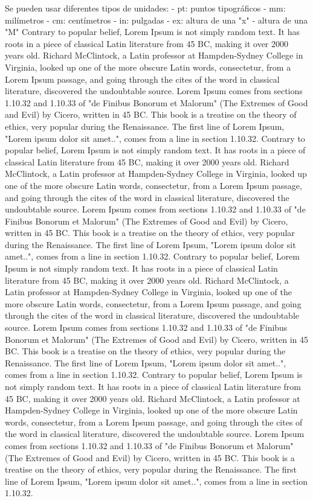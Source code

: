 \documentclass[12pt,letterpaper]{article} %
\begin{document}
	Se pueden usar diferentes tipos de unidades:
	- pt: puntos tipográficos
	- mm: milímetros
	- cm: centímetros
	- in: pulgadas
	- ex: altura de una "x"
	- altura de una "M"
	Contrary to popular belief, Lorem Ipsum is not simply random text. It has roots in a piece of classical Latin literature from 45 BC, making it over 2000 years old. Richard McClintock, a Latin professor at Hampden-Sydney College in Virginia, looked up one of the more obscure Latin words, consectetur, from a Lorem Ipsum passage, and going through the cites of the word in classical literature, discovered the undoubtable source. Lorem Ipsum comes from sections 1.10.32 and 1.10.33 of "de Finibus Bonorum et Malorum" (The Extremes of Good and Evil) by Cicero, written in 45 BC. This book is a treatise on the theory of ethics, very popular during the Renaissance. The first line of Lorem Ipsum, "Lorem ipsum dolor sit amet..", comes from a line in section 1.10.32.
	Contrary to popular belief, Lorem Ipsum is not simply random text. It has roots in a piece of classical Latin literature from 45 BC, making it over 2000 years old. Richard McClintock, a Latin professor at Hampden-Sydney College in Virginia, looked up one of the more obscure Latin words, consectetur, from a Lorem Ipsum passage, and going through the cites of the word in classical literature, discovered the undoubtable source. Lorem Ipsum comes from sections 1.10.32 and 1.10.33 of "de Finibus Bonorum et Malorum" (The Extremes of Good and Evil) by Cicero, written in 45 BC. This book is a treatise on the theory of ethics, very popular during the Renaissance. The first line of Lorem Ipsum, "Lorem ipsum dolor sit amet..", comes from a line in section 1.10.32.
	Contrary to popular belief, Lorem Ipsum is not simply random text. It has roots in a piece of classical Latin literature from 45 BC, making it over 2000 years old. Richard McClintock, a Latin professor at Hampden-Sydney College in Virginia, looked up one of the more obscure Latin words, consectetur, from a Lorem Ipsum passage, and going through the cites of the word in classical literature, discovered the undoubtable source. Lorem Ipsum comes from sections 1.10.32 and 1.10.33 of "de Finibus Bonorum et Malorum" (The Extremes of Good and Evil) by Cicero, written in 45 BC. This book is a treatise on the theory of ethics, very popular during the Renaissance. The first line of Lorem Ipsum, "Lorem ipsum dolor sit amet..", comes from a line in section 1.10.32.
	Contrary to popular belief, Lorem Ipsum is not simply random text. It has roots in a piece of classical Latin literature from 45 BC, making it over 2000 years old. Richard McClintock, a Latin professor at Hampden-Sydney College in Virginia, looked up one of the more obscure Latin words, consectetur, from a Lorem Ipsum passage, and going through the cites of the word in classical literature, discovered the undoubtable source. Lorem Ipsum comes from sections 1.10.32 and 1.10.33 of "de Finibus Bonorum et Malorum" (The Extremes of Good and Evil) by Cicero, written in 45 BC. This book is a treatise on the theory of ethics, very popular during the Renaissance. The first line of Lorem Ipsum, "Lorem ipsum dolor sit amet..", comes from a line in section 1.10.32.
\end{document}

